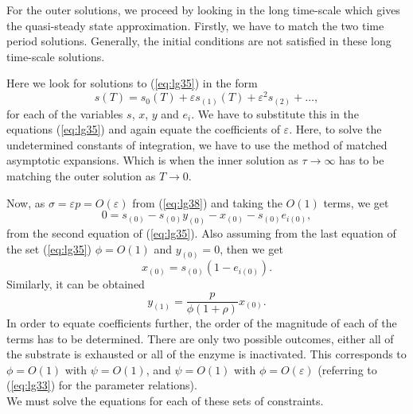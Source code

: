 \documentclass[a4paper]{report}
\theoremstyle{definition}
\begin{document}
For the outer solutions, we proceed by looking in the long time-scale which gives the quasi-steady state approximation. Firstly, we have to match the two time period solutions. Generally, the initial conditions are not satisfied in these long time-scale solutions.

Here we look for solutions to (\ref{eq:lg35}) in the form
\begin{equation}
s(T)=s_0(T)+\varepsilon s_{(1)}(T)+\varepsilon^2 s_{(2)}+\dots ,
\label{eq:lg39}
\end{equation}
for each of the variables $s$, $x$, $y$ and $e_i$. We have to substitute this in the equations (\ref{eq:lg35}) and again equate the coefficients of $\varepsilon$. Here, to solve the undetermined constants of integration, we have to use the method of matched asymptotic expansions. Which is when the inner solution as $\tau \rightarrow \infty$ has to be matching the outer solution as $T \rightarrow 0$.

Now, as $\sigma=\varepsilon p=O(\varepsilon)$ from (\ref{eq:lg38}) and taking the $O(1)$ terms, we get
\begin{equation}
0=s_{(0)}-s_{(0)}y_{(0)}-x_{(0)} -s_{(0)}e_{i(0)},
\end{equation}
from the second equation of (\ref{eq:lg35}). Also assuming  from the last equation of the set (\ref{eq:lg35}) $\phi=O(1)$ and $y_{(0)}=0$, then we get
\begin{equation}
x_{(0)}=s_{(0)}(1-e_{i(0)}).
\label{eq:lg40}
\end{equation}
Similarly, it can be obtained 
\begin{equation}
y_{(1)}=\frac{p}{\phi(1+\rho)}x_{(0)}.
\label{eq:lg41}
\end{equation}
In order to equate coefficients further, the order of the magnitude of each of the terms has to be determined. There are only two possible outcomes, either all of the substrate is exhausted or all of the enzyme is inactivated. This corresponds to $\phi=O(1)$ with $\psi=O(1)$, and $\psi=O(1)$ with $\phi=O(\varepsilon)$ (referring to (\ref{eq:lg33}) for the parameter relations). 
\\
We must solve the equations for each of these sets of constraints.
\\
\end{document}
